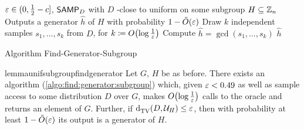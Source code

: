 \begin{algorithm}
  \begin{algorithmic}
    \Require $\varepsilon\in(0,\frac{1}{2}-c]$, ${\sf SAMP}_D$ with $D$ \eps-close to uniform on some subgroup $H\subseteq\mathbb{Z}_n$
    \Ensure Outputs a generator $\hat{h}$ of $H$ with probability $1-\tildeO{\eps}$
    \State Draw $k$ independent samples $s_1,\dots,s_k$ from $D$, for $k\eqdef\bigO{\log\frac{1}{\eps}}$
    \State Compute $\hat{h}=\gcd(s_1,\dots,s_k)$
    \State \Return $\hat{h}$
  \end{algorithmic}\caption{\label{algo:find:generator:subgroup} Algorithm {\sc Find-Generator-Subgroup}}
\end{algorithm}

\begin{restatable}{lemma}{unifsubgroupfindgenerator}\label{lemma:find:generator:subgroup}
  Let $G$, $H$ be as before. There exists an algorithm (\autoref{algo:find:generator:subgroup}) which, given $\varepsilon < 0.49$ as well as sample access to some distribution $D$ over $G$, makes $\bigO{\log\frac{1}{\eps}}$ calls to the oracle and returns an element of $G$. Further, if ${\operatorname{d}_{\textrm{TV}}^{}\!\left({D, \mathcal{U}_H}\right)} \leq \varepsilon$, then with probability at least $1-\tildeO{\eps}$ its output is a generator of $H$.
\end{restatable}
